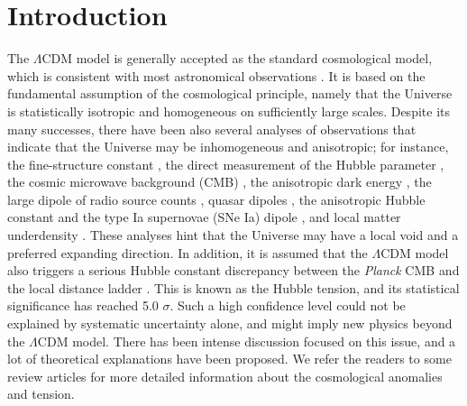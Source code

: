 \documentclass{aa}
\begin{document}
\section{Introduction} \label{sec:intro} 
The $\Lambda$CDM model is generally accepted as the standard cosmological model, which is consistent with most astronomical observations \citep{2018ApJ...859..101S,2019PhRvL.122q1301A,2020MNRAS.492.4456K,2022ApJ...938..110B,2022MNRAS.513.5686C,2022MNRAS.514.1828D,2022MNRAS.516.2575J,2022ApJ...931...50L,2022PhRvD.106j3530P,2022ApJ...924...97W,2023PhRvD.107f3522D,2023MNRAS.522.1247K,2023MNRAS.521.4406L}. It is based on the fundamental assumption of the cosmological principle, namely that the Universe is statistically isotropic and homogeneous on sufficiently large scales. Despite its many successes, there have been also several analyses of observations that indicate that the Universe may be inhomogeneous and anisotropic; for instance, the fine-structure constant \citep{2011PhRvL.107s1101W,2012MNRAS.422.3370K,2017ChPhC..41f5102L,2022arXiv221202458M}, the direct measurement of the Hubble parameter \citep{2006PhRvL..96s1302B,2021PhRvL.126w1101K}, the cosmic microwave background (CMB)
\citep{2003ApJS..148....1B,2003PhRvD..68l3523T,2004MNRAS.355.1283B,2011ApJS..192...17B,2011MNRAS.411.1445G,2020MNRAS.492.3994G,2020A&A...641A...7P}, the anisotropic dark energy \citep{2008JCAP...06..018K,2012PhRvD..86h3517M,2020JCAP...10..019B,2021PDU....3200806M}, the large dipole of radio source counts \citep{2014A&A...565A.111R,2017MNRAS.471.1045C,2018MNRAS.477.1772R,2019PhRvD.100f3501S,2023MNRAS.524.3636S}, quasar dipoles \citep{2005AA...441..915H,2016AA...590A..53P,2019AA...622A.113T,2020A&A...643A..93H,2021ApJ...908L..51S,2021EPJC...81..948Z,2021EPJC...81..694Z,2023MNRAS.525..231D}, the anisotropic Hubble constant \citep{2022PhRvD.105j3510L,2023arXiv230402718M} and the type Ia supernovae (SNe Ia) dipole \citep{2011MNRAS.414..264C,2014MNRAS.437.1840Y,2015ApJ...810...47J,2018MNRAS.478.5153S,2018MNRAS.474.3516W,Tang_2023}, and local matter underdensity \citep{2020PhRvD.102b3520K}. These analyses hint that the Universe may have a local void and a preferred expanding direction. In addition, it is assumed that the $\Lambda$CDM model also triggers a serious Hubble constant discrepancy between the \emph{Planck} CMB \citep{2020A&A...641A...6P} and the local distance ladder \citep{2019ApJ...876...85R,2022ApJ...934L...7R}. This is known as the Hubble tension, and its statistical significance has reached 5.0 $\sigma$. Such a high confidence level could not be explained by systematic uncertainty alone, and might imply new physics beyond the $\Lambda$CDM model. There has been intense discussion focused on this issue, and a lot of theoretical explanations have been proposed. We refer the readers to some review articles \citep{2021CQGra..38o3001D,2021A&ARv..29....9S,2022JHEAp..34...49A,2022NewAR..9501659P,2023Univ....9...94H,2023CQGra..40i4001K,2023arXiv230911552K,2023arXiv230810954R,2023Univ....9..393V} for more detailed information about the cosmological anomalies and tension.
\end{document}
